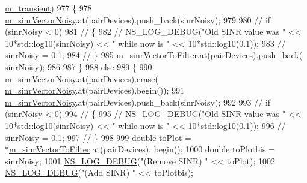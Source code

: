 \begin{DoxyCode}
      \hyperlink{classns3_1_1MmWaveEnbPhy_a60467889c9c76cba890f049098f4a822}{m\_transient})
977                         \{
978                                 \hyperlink{classns3_1_1MmWaveEnbPhy_a796cebfd5468736861afc539d2ec4098}{m\_sinrVectorNoisy}.at(pairDevices).push\_back(sinrNoisy);
979 
980                                  \textcolor{comment}{// if (sinrNoisy < 0)}
981                                  \textcolor{comment}{// \{}
982                                  \textcolor{comment}{//     NS\_LOG\_DEBUG("Old SINR value was " << 10*std::log10(sinrNoisy) << "
       while now is " << 10*std::log10(0.1));}
983                                  \textcolor{comment}{//     sinrNoisy = 0.1;}
984                                  \textcolor{comment}{// \}   }
985                                 \hyperlink{classns3_1_1MmWaveEnbPhy_a2887e6ce935c6d25fc2759269b811bbe}{m\_sinrVectorToFilter}.at(pairDevices).push\_back(
      sinrNoisy);
986                                 
987                         \}
988                         \textcolor{keywordflow}{else}
989                         \{
990                                 \hyperlink{classns3_1_1MmWaveEnbPhy_a796cebfd5468736861afc539d2ec4098}{m\_sinrVectorNoisy}.at(pairDevices).erase(
      \hyperlink{classns3_1_1MmWaveEnbPhy_a796cebfd5468736861afc539d2ec4098}{m\_sinrVectorNoisy}.at(pairDevices).begin());
991                                 \hyperlink{classns3_1_1MmWaveEnbPhy_a796cebfd5468736861afc539d2ec4098}{m\_sinrVectorNoisy}.at(pairDevices).push\_back(sinrNoisy);
992 
993                                  \textcolor{comment}{// if (sinrNoisy < 0)}
994                                  \textcolor{comment}{// \{}
995                                  \textcolor{comment}{//     NS\_LOG\_DEBUG("Old SINR value was " << 10*std::log10(sinrNoisy) << "
       while now is " << 10*std::log10(0.1));}
996                                  \textcolor{comment}{//     sinrNoisy = 0.1;}
997                                  \textcolor{comment}{// \}   }
998 
999                                 \textcolor{keywordtype}{double} toPlot = *\hyperlink{classns3_1_1MmWaveEnbPhy_a2887e6ce935c6d25fc2759269b811bbe}{m\_sinrVectorToFilter}.at(pairDevices).
      begin();
1000                                 \textcolor{keywordtype}{double} toPlotbis = sinrNoisy;
1001                                 \hyperlink{group__logging_ga413f1886406d49f59a6a0a89b77b4d0a}{NS\_LOG\_DEBUG}(\textcolor{stringliteral}{"(Remove SINR)  "} << toPlot);
1002                                 \hyperlink{group__logging_ga413f1886406d49f59a6a0a89b77b4d0a}{NS\_LOG\_DEBUG}(\textcolor{stringliteral}{"(Add SINR)  "} << toPlotbis);

\end{DoxyCode}
